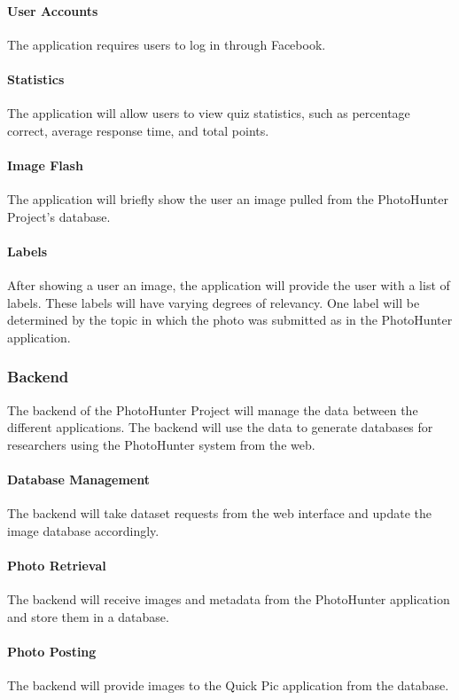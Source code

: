 \documentclass{article}
\begin{document}
  \paragraph{User Accounts}
  The application requires users to log in through Facebook.

  \paragraph{Statistics}
  The application will allow users to view quiz statistics, such as percentage
  correct, average response time, and total points.

  \paragraph{Image Flash}
  The application will briefly show the user an image pulled from the
  PhotoHunter Project's database.

  \paragraph{Labels}
  After showing a user an image, the application will provide the user with a
  list of labels. These labels will have varying degrees of relevancy. One label
  will be determined by the topic in which the photo was submitted as in the
  PhotoHunter application.

\subsubsection{Backend}
The backend of the PhotoHunter Project will manage the data between the different
applications. The backend will use the data to generate databases for researchers
using the PhotoHunter system from the web.

  \paragraph{Database Management}
  The backend will take dataset requests from the web interface and update the
  image database accordingly.

  \paragraph{Photo Retrieval}
  The backend will receive images and metadata from the PhotoHunter application
  and store them in a database.

  \paragraph{Photo Posting}
  The backend will provide images to the Quick Pic application from the database.
\end{document}
